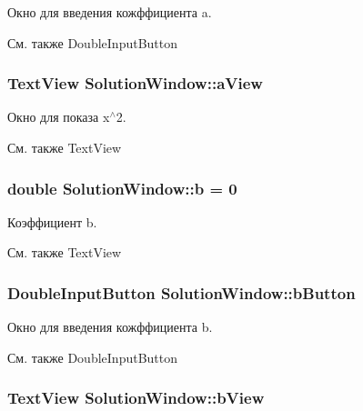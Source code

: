 Окно для введения кожффициента a. 

\begin{DoxySeeAlso}{См. также}
DoubleInputButton  
\end{DoxySeeAlso}
\hypertarget{group___u_i_ga7777447806a3220e12c5e41bbda00652}{
\subsubsection[{aView}]{\setlength{\rightskip}{0pt plus 5cm}TextView {\bf SolutionWindow::aView}}}
\label{group___u_i_ga7777447806a3220e12c5e41bbda00652}


Окно для показа x$^\wedge$2. 

\begin{DoxySeeAlso}{См. также}
TextView  
\end{DoxySeeAlso}
\hypertarget{group___u_i_ga4309ca79bdd7b0fedaedecb6e6e31f04}{
\subsubsection[{b}]{\setlength{\rightskip}{0pt plus 5cm}double {\bf SolutionWindow::b} = 0}}
\label{group___u_i_ga4309ca79bdd7b0fedaedecb6e6e31f04}


Коэффициент b. 

\begin{DoxySeeAlso}{См. также}
TextView  
\end{DoxySeeAlso}
\hypertarget{group___u_i_ga2a7741741b2199ac222556281f1474c0}{
\subsubsection[{bButton}]{\setlength{\rightskip}{0pt plus 5cm}DoubleInputButton {\bf SolutionWindow::bButton}}}
\label{group___u_i_ga2a7741741b2199ac222556281f1474c0}


Окно для введения кожффициента b. 

\begin{DoxySeeAlso}{См. также}
DoubleInputButton  
\end{DoxySeeAlso}
\hypertarget{group___u_i_ga5bbdd7ce43a736efddb212202d968229}{
\subsubsection[{bView}]{\setlength{\rightskip}{0pt plus 5cm}TextView {\bf SolutionWindow::bView}}}
\label{group___u_i_ga5bbdd7ce43a736efddb212202d968229}


